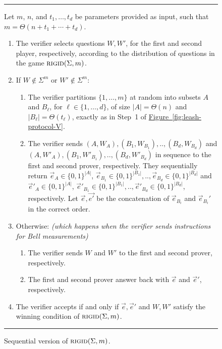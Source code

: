 \documentclass[11pt]{article}
\numberwithin{equation}{section}
\theoremstyle{definition}
\theoremstyle{plain}
\newcommand{\expref}[2]{\hyperref[#2]{#1~\ref{#2}}}
\newcommand{\rigid}{\textsc{rigid}}
\begin{document}
\begin{figure}[H]
\rule[1ex]{\textwidth}{0.5pt}
\vspace{-25pt}
\justify 
Let $m$, $n$, and $t_1,\ldots,t_d$ be parameters provided as input, such that $m = \Theta(n+t_1+\cdots+t_d)$. 
\begin{enumerate}
\item The verifier selects questions $W,W'$, for the first and second player,
%
respectively, according to the distribution of questions in the game $\rigid(\Sigma,m)$.
\item If $W \not\in \Sigma^m$ or $W' \not\in \Sigma^m$: 
\begin{enumerate}
\item The verifier partitions $\{1,\ldots,m\}$ at random into subsets $A$ and $B_\ell$, for $\ell\in\{1,\ldots,d\}$, of size $|A|=\Theta(n)$ and $|B_\ell|=\Theta(t_\ell)$, exactly as in Step~1 of \expref{Figure}{fig:leash-protocol-V}. 
\item The verifier sends $(A,W_A), (B_1,W_{B_1}),.., (B_d,W_{B_d})$ and $(A,W'_A), (B_1,W'_{B_1}), .., (B_d,W'_{B_d})$ in sequence to the first and second prover, %
respectively. They sequentially return %
 $\vec{e}_A \in \{0,1\}^{|A|}$, $\vec{e}_{B_1} \in \{0,1\}^{|B_1|},.., \vec{e}_{B_d} \in \{0,1\}^{|B_d|}$ and $\vec{e}'_A \in \{0,1\}^{|A|}$, $\vec{e}'_{B_1} \in \{0,1\}^{|B_1|},.., \vec{e}'_{B_d} \in \{0,1\}^{|B_d|}$,
respectively.  %
Let $\vec{e},\vec{e'}$ be the concatenation of $\vec{e}_{B_i}$ and $\vec{e}_{B_i}'$ in the correct order.
\end{enumerate}
\item Otherwise: \textit{(which happens when the verifier sends instructions for Bell measurements)} 
\begin{enumerate}
    \item The verifier sends $W$ and $W'$ to the first and second prover, respectively. 
    \item The %
%
first and second prover answer  %
back with $\vec{e}$ and $\vec{e}'$, respectively.
\end{enumerate}

\item The verifier accepts if and only if $\vec{e},\vec{e}'$ and $W,W'$ satisfy the winning condition of $\rigid(\Sigma,m)$.
\end{enumerate}
\rule[2ex]{\textwidth}{0.5pt}\vspace{-.5cm}
\caption{Sequential version of $\rigid(\Sigma,m)$.}
\label{fig:consistency-game}
\label{fig:rigidity-sequential}
\end{figure} 
\end{document}
